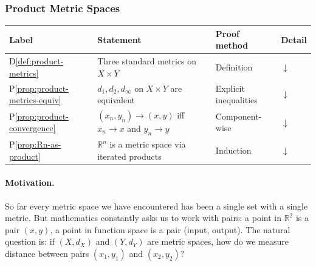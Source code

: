 %

\subsubsection{Product Metric Spaces}
\label{sec:product-metric}

\begin{tcolorbox}[colback=gray!6, colframe=gray!40, arc=2pt,
  left=6pt, right=6pt, top=4pt, bottom=4pt,
  title={\small\textbf{Product Metrics --- Quick Reference}},
  fonttitle=\small\bfseries]
\small
\begin{tabular}{l l l l}
\toprule
\textbf{Label} & \textbf{Statement} & \textbf{Proof method} & \textbf{Detail} \\
\midrule
D\ref{def:product-metrics}
  & Three standard metrics on $X \times Y$
  & Definition
  & \hyperref[def:product-metrics]{$\downarrow$} \\[4pt]
P\ref{prop:product-metrics-equiv}
  & $d_1, d_2, d_\infty$ on $X \times Y$ are equivalent
  & Explicit inequalities
  & \hyperref[prop:product-metrics-equiv]{$\downarrow$} \\[4pt]
P\ref{prop:product-convergence}
  & $(x_n, y_n) \to (x,y)$ iff $x_n \to x$ and $y_n \to y$
  & Component-wise
  & \hyperref[prop:product-convergence]{$\downarrow$} \\[4pt]
P\ref{prop:Rn-as-product}
  & $\mathbb{R}^n$ is a metric space via iterated products
  & Induction
  & \hyperref[prop:Rn-as-product]{$\downarrow$} \\[4pt]
\bottomrule
\end{tabular}
\end{tcolorbox}

\paragraph{Motivation.}
So far every metric space we have encountered has been a single set
with a single metric.
But mathematics constantly asks us to work with pairs:
a point in $\mathbb{R}^2$ is a pair $(x,y)$,
a point in function space is a pair (input, output).
The natural question is: if $(X, d_X)$ and $(Y, d_Y)$ are metric spaces,
how do we measure distance between pairs $(x_1, y_1)$ and $(x_2, y_2)$?

